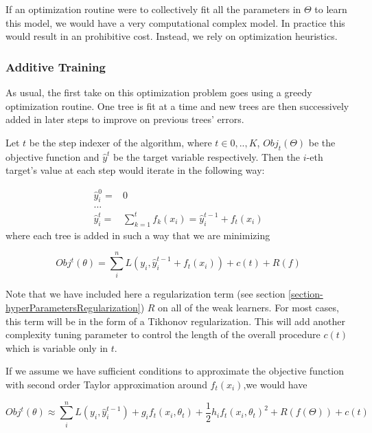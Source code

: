 If an optimization routine were to collectively fit all the parameters in $\Theta$ to learn this model, we would have a very computational complex model. In practice this would result in an prohibitive cost. Instead, we rely on optimization heuristics.

\subsubsection{Additive Training}

As usual, the first take on this optimization problem goes using a greedy optimization routine. One tree is fit at a time and new trees are then successively added in later steps to improve on previous trees' errors.

Let $t$ be the step indexer of the algorithm, where $t \in {0,..,K}$, $Obj_t(\Theta)$ be the objective function and $\hat{y}^t$ be the target variable respectively. Then the $i$-eth target's value at each step would iterate in the following way:

\begin{equation}\label{eq:gb-targetSteps}
\begin{split}
\hat{y}_i^0 = & 0 \\
\ldots \\
\hat{y}_i^t = &\sum_{k=1}^{t} f_k(x_i) = \hat{y}^{t-1}_i + f_t(x_i)
\end{split}
\end{equation}
where each tree is added in such a way that we are minimizing

\begin{equation}
Obj^t(\theta) = \sum_i^n L(y_i, \hat{y}^{t-1}_i + f_t(x_i) ) + c(t) + R(f)
\end{equation}


Note that we have included here a regularization term (see section \cref{section-hyperParametersRegularization}) $R$ on all of the weak learners. For most cases, this term will be in the form of a Tikhonov regularization. This will add another complexity tuning parameter to control the length of the overall procedure $c(t)$ which is variable only in $t$.

If we assume we have sufficient conditions to approximate the objective function with second order Taylor approximation around $f_t(x_i)$,we would have

\begin{equation}\label{equation-gradientBoostingTaylor}
Obj^t(\theta) \approx \sum_i^n {L(y_i, \hat{y}^{t-1}_i) + g_i f_t(x_i,\theta_t) + \frac{1}{2} h_i {f_t(x_i,\theta_t)}^2 } + R(f(\Theta)) + c(t)
\end{equation}


